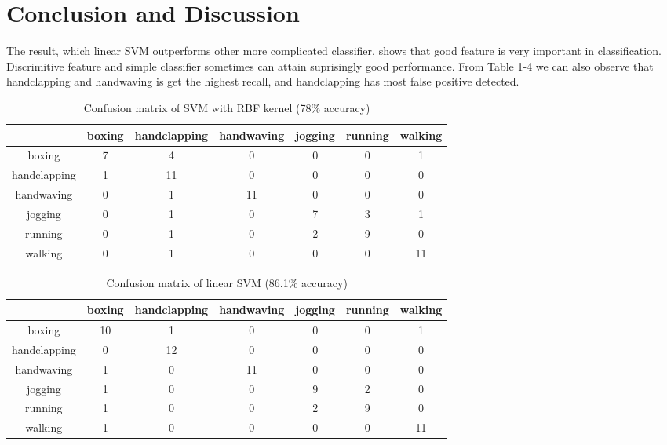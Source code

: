 \documentclass{article}
\begin{document}
\section{Conclusion and Discussion}
The result, which linear SVM outperforms other more complicated classifier, shows that good feature is very important in classification. Discrimitive feature and simple classifier sometimes can attain suprisingly good performance. From Table 1-4 we can also observe that handclapping and handwaving is get the highest recall, and handclapping has most false positive detected. 

\begin{table}[b]
\caption{Confusion matrix of SVM with RBF kernel (78\% accuracy)}
\begin{center}
\begin{tabular}{c|cccccc}\hline
&boxing&handclapping &handwaving &jogging &running &walking\\ \hline
boxing&7& 4& 0& 0& 0& 1\\
handclapping&1& 11& 0& 0& 0& 0\\
handwaving&0& 1& 11&0 &0 &0 \\
jogging&0& 1& 0&7 &3 &1 \\
running&0& 1&0 &2 &9 &0 \\
walking&0&1 &0 &0 &0 &11 \\ \hline
\end{tabular}
\end{center}
\end{table} 

\begin{table}[bh]
\caption{Confusion matrix of linear SVM (86.1\% accuracy)}
\begin{center}
\begin{tabular}{c|cccccc}\hline
&boxing&handclapping &handwaving &jogging &running &walking\\ \hline
boxing&10& 1& 0& 0& 0& 1\\
handclapping&0& 12& 0& 0& 0& 0\\
handwaving&1& 0& 11&0 &0 &0 \\
jogging&1& 0& 0&9 &2 &0 \\
running&1& 0&0 &2 &9 &0 \\
walking&1&0 &0 &0 &0 &11 \\ \hline
\end{tabular}
\end{center}
\end{table} 
\end{document}
